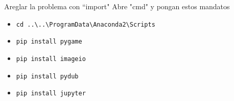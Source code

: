 \documentclass{beamer}
\begin{document}
\begin{frame}{Areglar la problema con ``import"}
   Abre "cmd" y pongan estos mandatos
   \begin{itemize}
      \item \texttt{cd ..\textbackslash..\textbackslash ProgramData\textbackslash Anaconda2\textbackslash Scripts}
      \item \texttt{pip install pygame}
      \item \texttt{pip install imageio}
      \item \texttt{pip install pydub}
      \item \texttt{pip install jupyter}
   \end{itemize}
\end{frame}
\end{document}
